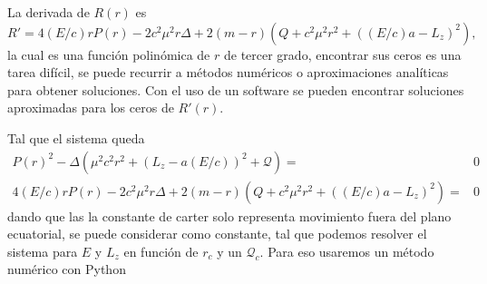 La derivada de $R(r)$ es
\begin{equation}
    R' = 4 (E/c) r P(r)-2 c^2 \mu^2 r \Delta+2(m-r)\left(Q+c^2 \mu^2 r^2+\left((E/c) a-L_z\right)^2\right),
\end{equation}
la cual es una función polinómica de $r$ de tercer grado, encontrar sus ceros es una tarea difícil, se puede recurrir a métodos numéricos o aproximaciones analíticas para obtener soluciones.
Con el uso de un software se pueden encontrar soluciones aproximadas para los ceros de $R'(r)$.

Tal que el sistema queda 
\begin{equation}
\begin{aligned}
    P(r)^2-\Delta\left(\mu^2 c^2 r^2+\left(L_z-a(E / c)\right)^2+\mathcal{Q}\right)  = &0 \\
    4 (E/c) r P(r)-2 c^2 \mu^2 r \Delta+2(m-r)\left(Q+c^2 \mu^2 r^2+\left((E/c) a-L_z\right)^2\right)= &0
\end{aligned}    
\end{equation}
dando que las la constante de carter solo representa movimiento fuera del plano ecuatorial, se puede considerar como constante, tal que podemos resolver el sistema para $E$ y $L_z$ en función de $r_c$ y un $\mathcal{Q}_c$.
Para eso usaremos un método numérico con Python
